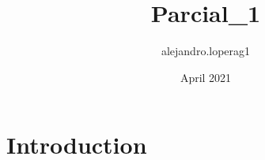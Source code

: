 \documentclass{article}
\title{Parcial_1}
\author{alejandro.loperag1 }
\date{April 2021}
\begin{document}
\maketitle

\section{Introduction}
\end{document}
